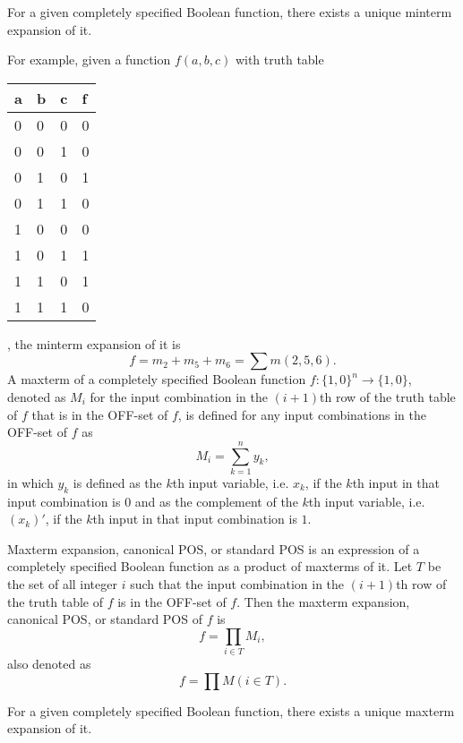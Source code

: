 \documentclass[a4paper,12pt]{report}
\begin{document}
\begin{itemize}
\begin{itemize}
\begin{itemize}
\begin{itemize}
\begin{itemize}
\begin{itemize}
\begin{itemize}
\begin{itemize}
For a given completely specified Boolean function, there exists a unique minterm expansion of it.

For example, given a function $f(a,b,c)$ with truth table
\begin{longtable}[c]{|m|m|m|m|}
\hline
a & b & c & f\\\hline
0 & 0 & 0 & 0\\\hline
0 & 0 & 1 & 0\\\hline
0 & 1 & 0 & 1\\\hline
0 & 1 & 1 & 0\\\hline
1 & 0 & 0 & 0\\\hline
1 & 0 & 1 & 1\\\hline
1 & 1 & 0 & 1\\\hline
1 & 1 & 1 & 0\\\hline
\end{longtable}
, the minterm expansion of it is
\[f=m_2+m_5+m_6=\sum m(2,5,6).\]
A maxterm of a completely specified Boolean function $f\colon\{1,0\}^n\to\{1,0\}$, denoted as $M_i$ for the input combination in the $(i+1)$th row of the truth table of $f$ that is in the OFF-set of $f$, is defined for any input combinations in the OFF-set of $f$ as
\[M_i=\sum_{k=1}^ny_k,\]
in which $y_k$ is defined as the $k$th input variable, i.e. $x_k$, if the $k$th input in that input combination is $0$ and as the complement of the $k$th input variable, i.e. $(x_k)'$, if the $k$th input in that input combination is $1$.

Maxterm expansion, canonical POS, or standard POS is an expression of a completely specified Boolean function as a product of maxterms of it. Let $T$ be the set of all integer $i$ such that the input combination in the $(i+1)$th row of the truth table of $f$ is in the OFF-set of $f$. Then the maxterm expansion, canonical POS, or standard POS of $f$ is
\[f=\prod_{i\in T}M_i,\]
also denoted as 
\[f=\prod M(i\in T).\]

For a given completely specified Boolean function, there exists a unique maxterm expansion of it.


\end{itemize}
\end{itemize}
\end{itemize}
\end{itemize}
\end{itemize}
\end{itemize}
\end{itemize}
\end{itemize}
\end{document}
